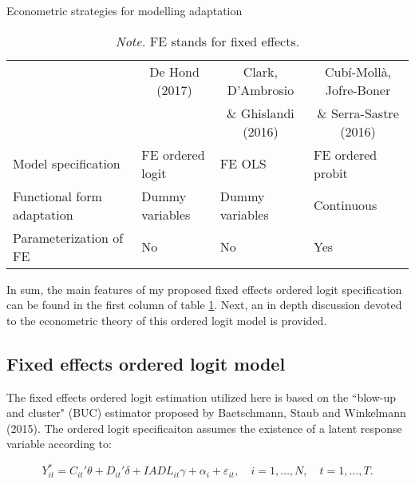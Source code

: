 \documentclass[12pt]{article}
\begin{document}
\begin{table}[htbp]
\centering
\footnotesize
\caption{Econometric strategies for modelling adaptation}
\label{modelchoice}
\begin{tabular}{l lll}
\hline
& \multicolumn{1}{c}{De Hond (2017)} & \multicolumn{1}{c}{Clark, D'Ambrosio} & \multicolumn{1}{c}{Cub\'i-Moll\`a, Jofre-Boner} \\
& \multicolumn{1}{c}{} & \multicolumn{1}{c}{\& Ghislandi (2016)} & \multicolumn{1}{c}{\& Serra-Sastre (2016)}\\\hline\hline
Model specification                & FE ordered logit            & FE OLS               & FE ordered probit \\
Functional form adaptation         & Dummy variables             & Dummy variables      & Continuous      \\
Parameterization of FE             & No                          & No                   & Yes   \\
\hline
\end{tabular}
\caption*{\footnotesize{\textit{Note.} FE stands for fixed effects.}}
\end{table}

In sum, the main features of my proposed fixed effects ordered logit specification can be found in the first column of table \ref{modelchoice}. Next, an in depth discussion devoted to the econometric theory of this ordered logit model is provided.

\FloatBarrier


\subsection{Fixed effects ordered logit model}
The fixed effects ordered logit estimation utilized here is based on the ``blow-up and cluster" (BUC) estimator proposed by Baetschmann, Staub and Winkelmann (2015). The ordered logit specificaiton assumes the existence of a latent response variable according to:

\begin{equation}
    Y_{it}^* = C_{it}'\theta + D_{it}'\delta + IADL_{it}\gamma + \alpha_{i} + \varepsilon_{it}, \quad i=1,\ldots,N, \quad t=1,\ldots,T.
\end{equation}
\end{document}
